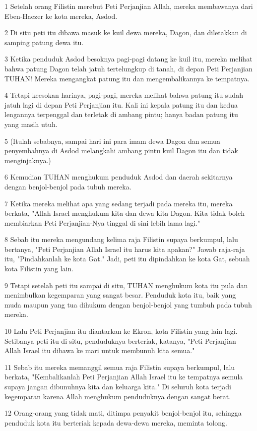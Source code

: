 \par 1 Setelah orang Filistin merebut Peti Perjanjian Allah, mereka membawanya dari Eben-Haezer ke kota mereka, Asdod.
\par 2 Di situ peti itu dibawa masuk ke kuil dewa mereka, Dagon, dan diletakkan di samping patung dewa itu.
\par 3 Ketika penduduk Asdod besoknya pagi-pagi datang ke kuil itu, mereka melihat bahwa patung Dagon telah jatuh tertelungkup di tanah, di depan Peti Perjanjian TUHAN! Mereka mengangkat patung itu dan mengembalikannya ke tempatnya.
\par 4 Tetapi keesokan harinya, pagi-pagi, mereka melihat bahwa patung itu sudah jatuh lagi di depan Peti Perjanjian itu. Kali ini kepala patung itu dan kedua lengannya terpenggal dan terletak di ambang pintu; hanya badan patung itu yang masih utuh.
\par 5 (Itulah sebabnya, sampai hari ini para imam dewa Dagon dan semua penyembahnya di Asdod melangkahi ambang pintu kuil Dagon itu dan tidak menginjaknya.)
\par 6 Kemudian TUHAN menghukum penduduk Asdod dan daerah sekitarnya dengan benjol-benjol pada tubuh mereka.
\par 7 Ketika mereka melihat apa yang sedang terjadi pada mereka itu, mereka berkata, "Allah Israel menghukum kita dan dewa kita Dagon. Kita tidak boleh membiarkan Peti Perjanjian-Nya tinggal di sini lebih lama lagi."
\par 8 Sebab itu mereka mengundang kelima raja Filistin supaya berkumpul, lalu bertanya, "Peti Perjanjian Allah Israel itu harus kita apakan?" Jawab raja-raja itu, "Pindahkanlah ke kota Gat." Jadi, peti itu dipindahkan ke kota Gat, sebuah kota Filistin yang lain.
\par 9 Tetapi setelah peti itu sampai di situ, TUHAN menghukum kota itu pula dan menimbulkan kegemparan yang sangat besar. Penduduk kota itu, baik yang muda maupun yang tua dihukum dengan benjol-benjol yang tumbuh pada tubuh mereka.
\par 10 Lalu Peti Perjanjian itu diantarkan ke Ekron, kota Filistin yang lain lagi. Setibanya peti itu di situ, penduduknya berteriak, katanya, "Peti Perjanjian Allah Israel itu dibawa ke mari untuk membunuh kita semua."
\par 11 Sebab itu mereka memanggil semua raja Filistin supaya berkumpul, lalu berkata, "Kembalikanlah Peti Perjanjian Allah Israel itu ke tempatnya semula supaya jangan dibunuhnya kita dan keluarga kita." Di seluruh kota terjadi kegemparan karena Allah menghukum penduduknya dengan sangat berat.
\par 12 Orang-orang yang tidak mati, ditimpa penyakit benjol-benjol itu, sehingga penduduk kota itu berteriak kepada dewa-dewa mereka, meminta tolong.

